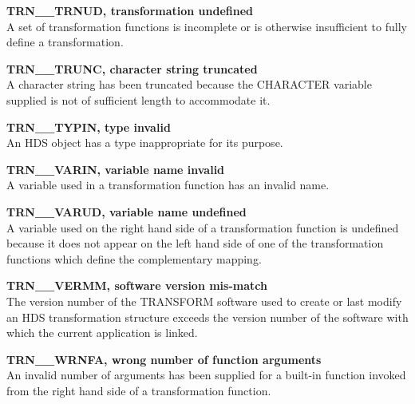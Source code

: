 \documentclass[twoside,11pt]{article}
\newcommand{\name}[1]{\mbox{\small{#1}}}
\begin{document}
\begin{description}
\item \textbf{TRN\_\_TRNUD, transformation undefined}\\
A set of transformation functions is incomplete or is otherwise insufficient
to fully define a transformation. 

\item \textbf{TRN\_\_TRUNC, character string truncated}\\
A character string has been truncated because the \name{CHARACTER} variable
supplied is not of sufficient length to accommodate it. 

\item \textbf{TRN\_\_TYPIN, type invalid}\\
An \name{HDS} object has a type inappropriate for its purpose.

\item \textbf{TRN\_\_VARIN, variable name invalid}\\
A variable used in a transformation function has an invalid name.

\item \textbf{TRN\_\_VARUD, variable name undefined}\\
A variable used on the right hand side of a transformation function is
undefined because it does not appear on the left hand side of one of the
transformation functions which define the complementary mapping. 

\item \textbf{TRN\_\_VERMM, software version mis-match}\\
The version number of the \name{TRANSFORM} software used to create or last
modify an \name{HDS} transformation structure exceeds the version number of
the software with which the current application is linked. 

\item \textbf{TRN\_\_WRNFA, wrong number of function arguments}\\
An invalid number of arguments has been supplied for a built-in function
invoked from the right hand side of a transformation function. 

\end{description}
\end{document}
